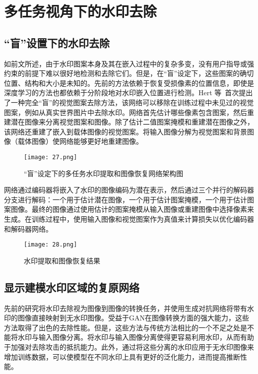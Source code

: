 \section{多任务视角下的水印去除}
\label{sec:multitask}

\subsection{“盲”设置下的水印去除}

如前文所述，由于水印图案本身及其在嵌入过程中的复杂多变，没有用户指导或强约束的前提下难以很好地检测和去除它们。但是，在“盲”设定下，这些图案的确切位置、结构和大小是未知的。先前的方法依赖于恢复受损像素的位置信息，即使是深度学习的方法也都依赖于分阶段地对水印嵌入位置进行检测。Hert 等~\cite{hertz2019blind}首次提出了一种完全“盲”的视觉图案去除方法，该网络可以移除在训练过程中未见过的视觉图案，例如从真实世界图片中去除水印。网络首先估计哪些像素包含图案，然后重建潜在图像来分离视觉图案和图像。除了估计二值图案掩模和重建潜在图像之外，该网络还重建了嵌入到载体图像的视觉图案。将输入图像分解为视觉图案和背景图像（载体图像）使网络能够更好地重建图像。

\begin{figure}[!htbp]
	\centering
	\texttt{[image: 27.png]}
	\caption{“盲”设定下的多任务水印提取和图像恢复网络架构图}
	\label{fig:27}
\end{figure}

网络通过编码器将嵌入了水印的图像编码为潜在表示，然后通过三个并行的解码器分支进行解码：一个用于估计潜在图像，一个用于估计图案掩模，一个用于估计图案图像。最终的图像通过使用估计的图案掩模从输入图像或重建图像中选择像素来生成。在训练过程中，使用输入图像和视觉图案作为真值来计算损失以优化编码器和解码器网络。

\begin{figure}[!htbp]
	\centering
	\texttt{[image: 28.png]}
	\caption{水印提取和图像恢复结果}
	\label{fig:28}
\end{figure}

\subsection{显示建模水印区域的复原网络}

先前的研究将水印去除视为图像到图像的转换任务，并使用生成对抗网络将带有水印的图像直接映射到无水印图像。受益于GAN在图像转换方面的强大能力，这些方法取得了出色的去除性能。但是，这些方法与传统方法相比的一个不足之处是不能将水印与输入图像分离。将水印与输入图像分离使得更容易利用水印，从而有助于加强对去除攻击的抵抗能力。此外，通过将这些分离的水印应用于无水印图像来增加训练数据，可以使模型在不同水印上具有更好的泛化能力，进而提高推断性能。

